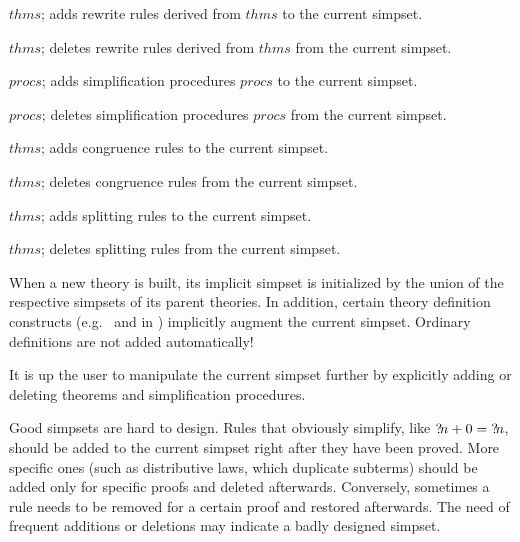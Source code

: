 \begin{ttdescription}

\item[\ttindexbold{Addsimps} $thms$;] adds rewrite rules derived from
  $thms$ to the current simpset.
  
\item[\ttindexbold{Delsimps} $thms$;] deletes rewrite rules derived
  from $thms$ from the current simpset.
  
\item[\ttindexbold{Addsimprocs} $procs$;] adds simplification
  procedures $procs$ to the current simpset.
  
\item[\ttindexbold{Delsimprocs} $procs$;] deletes simplification
  procedures $procs$ from the current simpset.
  
\item[\ttindexbold{Addcongs} $thms$;] adds congruence rules to the
  current simpset.
  
\item[\ttindexbold{Delcongs} $thms$;] deletes congruence rules from the
  current simpset.

\item[\ttindexbold{Addsplits} $thms$;] adds splitting rules to the
  current simpset.
  
\item[\ttindexbold{Delsplits} $thms$;] deletes splitting rules from the
  current simpset.

\end{ttdescription}

When a new theory is built, its implicit simpset is initialized by the
union of the respective simpsets of its parent theories.  In addition,
certain theory definition constructs (e.g.\  and
 in \HOL) implicitly augment the current simpset.
Ordinary definitions are not added automatically!

It is up the user to manipulate the current simpset further by
explicitly adding or deleting theorems and simplification procedures.

\medskip

Good simpsets are hard to design.  Rules that obviously simplify,
like ${?\!n}+0 = {?\!n}$, should be added to the current simpset right after
they have been proved.  More specific ones (such as distributive laws, which
duplicate subterms) should be added only for specific proofs and deleted
afterwards.  Conversely, sometimes a rule needs
to be removed for a certain proof and restored afterwards.  The need of
frequent additions or deletions may indicate a badly designed
simpset.

